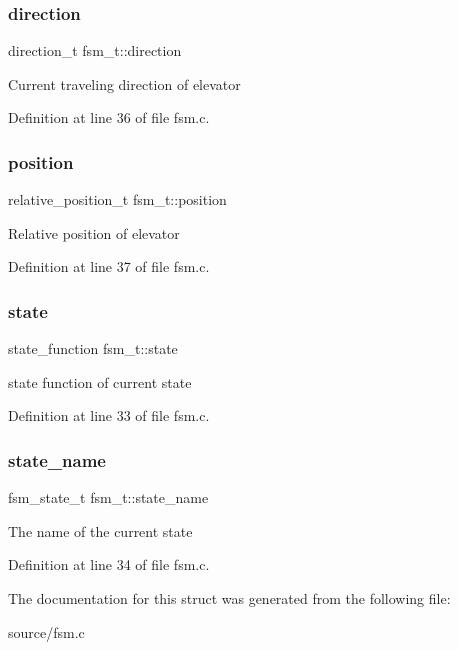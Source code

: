 \mbox{\label{structfsm__t_a4a22f2e6606e51b6d83309023ac1b4fc}} 
\subsubsection{\texorpdfstring{direction}{direction}}
{\footnotesize\ttfamily direction\+\_\+t fsm\+\_\+t\+::direction}

Current traveling direction of elevator 

Definition at line 36 of file fsm.\+c.

\mbox{\label{structfsm__t_ad6a67b3201e4002d25f058bb8bf9ffd5}} 
\subsubsection{\texorpdfstring{position}{position}}
{\footnotesize\ttfamily relative\+\_\+position\+\_\+t fsm\+\_\+t\+::position}

Relative position of elevator 

Definition at line 37 of file fsm.\+c.

\mbox{\label{structfsm__t_a712771896c61fba0983cdf9bb7c5aef3}} 
\subsubsection{\texorpdfstring{state}{state}}
{\footnotesize\ttfamily state\+\_\+function fsm\+\_\+t\+::state}

state function of current state 

Definition at line 33 of file fsm.\+c.

\mbox{\label{structfsm__t_a2ee302f4baedf2779e08f3d0cba24ae1}} 
\subsubsection{\texorpdfstring{state\+\_\+name}{state\_name}}
{\footnotesize\ttfamily fsm\+\_\+state\+\_\+t fsm\+\_\+t\+::state\+\_\+name}

The name of the current state 

Definition at line 34 of file fsm.\+c.



The documentation for this struct was generated from the following file\+:\begin{DoxyCompactItemize}
\item 
source/fsm.\+c\end{DoxyCompactItemize}
